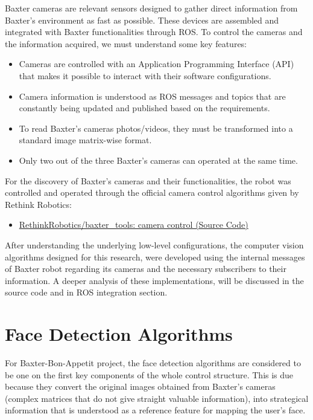 \documentclass[11pt]{report} %
\begin{document}
Baxter cameras are relevant sensors designed to gather direct information from Baxter's environment as fast as possible. These devices are assembled and integrated with Baxter functionalities through ROS. To control the cameras and the information acquired, we must understand some key features:

\begin{itemize}
    \item Cameras are controlled with an Application Programming Interface (API) that makes it possible to interact with their software configurations.
    \item Camera information is understood as ROS messages and topics that are constantly being updated and published based on the requirements.
    \item To read Baxter's cameras photos/videos, they must be transformed into a standard image matrix-wise format.
    \item Only two out of the three Baxter's cameras can operated at the same time.
\end{itemize}

For the discovery of Baxter's cameras and their functionalities, 
the robot was controlled and operated through the official camera control algorithms given by Rethink Robotics:

\begin{itemize}
    \color{blue}
    \item \href{https://github.com/RethinkRobotics/baxter_tools/blob/master/scripts/camera_control.py}{RethinkRobotics/baxter\_tools: camera control (Source Code)}
\end{itemize}

After understanding the underlying low-level configurations, the computer vision algorithms designed for this research, were developed using the internal messages of Baxter robot regarding its cameras and the necessary subscribers to their information. A deeper analysis of these implementations, will be discussed in the source code and in ROS integration section.\\


\section{Face Detection Algorithms}

For Baxter-Bon-Appetit project, the face detection algorithms are considered to be one on the first key components of the whole control structure. This is due because they convert the original images obtained from Baxter's cameras (complex matrices that do not give straight valuable information), into strategical information that is understood as a reference feature for mapping the user's face.\\
\end{document}
